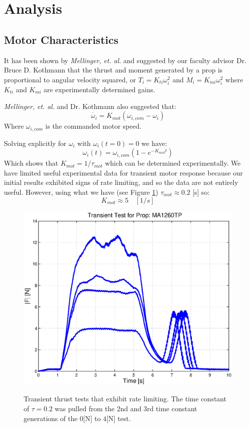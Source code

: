 \documentclass{article}
\numberwithin{equation}{section}
\begin{document}
\section{Analysis}
\subsection{Motor Characteristics}
It has been shown by \emph{Mellinger, et. al.} and suggested by our faculty advisor Dr. Bruce D. Kothmann that the thrust and moment generated by a prop is proportional to angular velocity squared, or $T_i = K_{ti} \omega_i^2$ and $M_i = K_{mi} \omega_i^2$ where $K_{ti}$ and $K_{mi}$ are experimentally determined gains.

\emph{Mellinger, et. al.} and Dr. Kothmann also suggested that:
\[\dot{\omega_i} = K_{mot}\left(\omega_{i,com} - \omega_i\right)\]
Where $\omega_{i,com}$ is the commanded motor speed.

Solving explicitly for $\omega_i$ with $\omega_{i}(t=0) = 0$ we have:
\[\omega_i\left(t\right) = \omega_{i,com}\left(1-e^{-K_{mot}t}\right)\]
Which shows that $K_{mot} = 1/\tau_{mot}$ which can be determined experimentally.  We have limited useful experimental data for transient motor response because our initial results exhibited signs of rate limiting, and so the data are not entirely useful.  However, using what we have (see Figure \ref{transientTests}) $\tau_{mot} \approx 0.2  $ [s] so:
\begin{equation}
\label{motorCoeff}
K_{mot} \approx 5 \quad [1/s]
\end{equation}
\begin{figure}[h]
  \includegraphics[width=5in]{images/transientThrust.eps}
  \label{transientTests}
  \caption{Transient thrust tests that exhibit rate limiting.  The time constant of $\tau=0.2$ was pulled from the 2nd and 3rd time constant generations of the $0$[N] to $4$[N] test.}
\end{figure}
\end{document}
